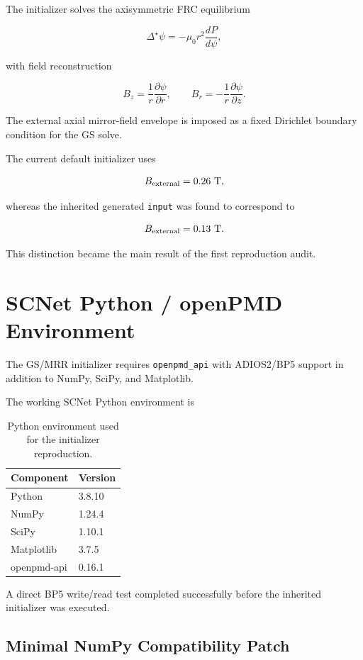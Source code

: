 \documentclass[11pt,a4paper]{article}
\begin{document}
The initializer solves the axisymmetric FRC equilibrium

\[
\Delta^\star\psi
=
-\mu_0 r^2\frac{dP}{d\psi},
\]

with field reconstruction

\[
B_z
=
\frac{1}{r}\frac{\partial\psi}{\partial r},
\qquad
B_r
=
-\frac{1}{r}\frac{\partial\psi}{\partial z}.
\]

The external axial mirror-field envelope is imposed as a fixed Dirichlet
boundary condition for the GS solve.

The current default initializer uses

\[
B_{\rm external}=0.26~\mathrm{T},
\]

whereas the inherited generated \texttt{input} was found to correspond to

\[
B_{\rm external}=0.13~\mathrm{T}.
\]

This distinction became the main result of the first reproduction audit.

\section{SCNet Python / openPMD Environment}

The GS/MRR initializer requires \texttt{openpmd\_api} with ADIOS2/BP5 support
in addition to NumPy, SciPy, and Matplotlib.

The working SCNet Python environment is

\begin{table}[htbp]
    \centering
    \caption{Python environment used for the initializer reproduction.}
    \begin{tabular}{ll}
        \toprule
        Component & Version \\
        \midrule
        Python & 3.8.10 \\
        NumPy & 1.24.4 \\
        SciPy & 1.10.1 \\
        Matplotlib & 3.7.5 \\
        openpmd-api & 0.16.1 \\
        \bottomrule
    \end{tabular}
\end{table}

A direct BP5 write/read test completed successfully before the inherited
initializer was executed.

\subsection{Minimal NumPy Compatibility Patch}
\end{document}
